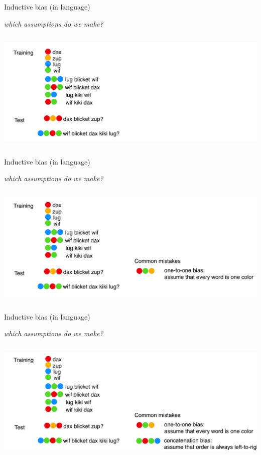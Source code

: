 \begin{frame}{Inductive bias (in language)}
\centerline{\textit{which assumptions do we make?}}
\centering\includegraphics[height=5.9cm]{image/img190213.jpg}

\end{frame}

\begin{frame}{Inductive bias (in language)}
\centerline{\textit{which assumptions do we make?}}
\centering\includegraphics[height=5.9cm]{image/img190532.jpg}

\end{frame}

\begin{frame}{Inductive bias (in language)}
\centerline{\textit{which assumptions do we make?}}
\centering\includegraphics[height=5.9cm]{image/img190839.jpg}

\end{frame}

